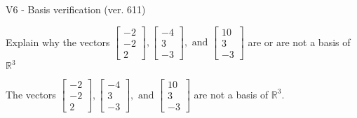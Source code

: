 \begin{exercise}
  \begin{exerciseTitle}V6 - Basis verification (ver. 611)\end{exerciseTitle}
  \begin{exerciseStatement}
    Explain why the vectors \(\left[\begin{array}{r}
-2 \\
-2 \\
2
\end{array}\right] , \left[\begin{array}{r}
-4 \\
3 \\
-3
\end{array}\right] , \text{ and } \left[\begin{array}{r}
10 \\
3 \\
-3
\end{array}\right]\) are or are not a basis of \(\mathbb{R}^3\)	


  \end{exerciseStatement}
  \begin{exerciseAnswer}
   The vectors \(\left[\begin{array}{r}
-2 \\
-2 \\
2
\end{array}\right] , \left[\begin{array}{r}
-4 \\
3 \\
-3
\end{array}\right] , \text{ and } \left[\begin{array}{r}
10 \\
3 \\
-3
\end{array}\right]\) 
  	 are not  a basis of \(\mathbb{R}^3\).
  


  \end{exerciseAnswer}
\end{exercise}